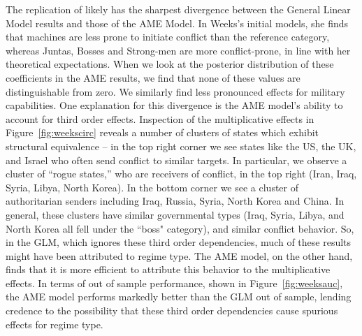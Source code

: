 The replication of \citet{weeks:2012} likely has the sharpest divergence between the General Linear Model results and those of the AME Model. In Weeks's initial models,  she finds that machines are less prone to initiate conflict than the reference category, whereas Juntas, Bosses and Strong-men are more conflict-prone, in line with her theoretical expectations. When we look at the posterior distribution of these coefficients in the AME results, we find that none of these values are distinguishable from zero. We similarly find less pronounced effects for military capabilities. One explanation for this divergence is the AME model's ability to account for third order effects. Inspection of the multiplicative effects in Figure~\ref{fig:weekscirc} reveals a number of clusters of states which exhibit structural equivalence -- in the top right corner we see states like the US, the UK, and Israel who often send conflict to similar targets. In particular, we observe a cluster of ``rogue states,'' who are receivers of conflict, in the top right (Iran, Iraq, Syria, Libya, North Korea). In the bottom corner we see a cluster of authoritarian senders including Iraq, Russia, Syria, North Korea and China. In general, these clusters have similar governmental types (Iraq, Syria, Libya, and North Korea all fell under the ``boss" category), and similar conflict behavior. So, in the GLM, which ignores these third order dependencies, much of these results might have been attributed to regime type. The AME model, on the other hand, finds that it is more efficient to attribute this behavior to the multiplicative effects. In terms of out of sample performance, shown in Figure~\ref{fig:weeksauc}, the AME model performs markedly better than the GLM out of sample, lending credence to the possibility that these third order dependencies cause spurious effects for regime type.

